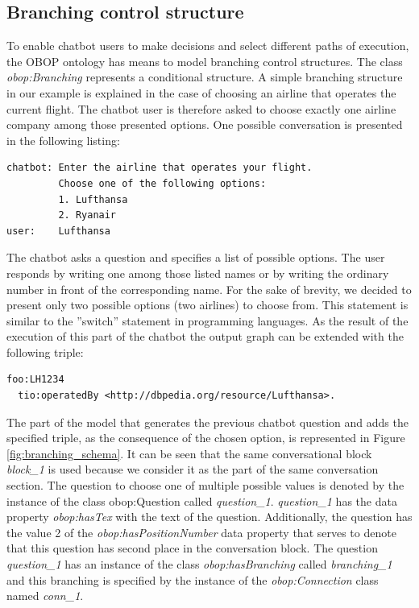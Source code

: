 \documentclass[runningheads]{llncs}
\begin{document}
\FloatBarrier
\subsection{Branching control structure}
To enable chatbot users to make decisions and select different paths of execution, the OBOP ontology has means to model branching control structures. The class \textit{obop:Branching} represents a conditional structure. A simple branching structure in our example is explained in the case of choosing an airline that operates the current flight. The chatbot user is therefore asked to choose exactly one airline company among those presented options.  
One possible conversation is presented in the following listing:
\begin{lstlisting}[basicstyle=\small,  xleftmargin=0.7cm ]
chatbot: Enter the airline that operates your flight.
         Choose one of the following options:
         1. Lufthansa
         2. Ryanair
user:    Lufthansa 
\end{lstlisting}
The chatbot asks a question and specifies a list of possible options. The user responds by writing one among those listed names or by writing the ordinary number in front of the corresponding name. For the sake of brevity, we decided to present only two possible options (two airlines) to choose from. This statement is similar to the ''switch'' statement in programming languages. As the result of the execution of this part of the chatbot the output graph can be extended with the following triple:
\begin{lstlisting}[basicstyle=\small,  xleftmargin=0.7cm ]
foo:LH1234
  tio:operatedBy <http://dbpedia.org/resource/Lufthansa>.
\end{lstlisting}
The part of the model that generates the previous chatbot question and adds the specified triple, as the consequence of the chosen option, is represented in Figure \ref{fig:branching_schema}. It can be seen that the same conversational block \textit{block\_1} is used because we consider it as the part of the same conversation section. The question to choose one of multiple possible values is denoted by the instance of the class obop:Question called \textit{question\_1}. \textit{question\_1} has the data property \textit{obop:hasTex} with the text of the question. Additionally, the question has the value 2 of the \textit{obop:hasPositionNumber} data property that serves to denote that this question has second place in the conversation block.         
The question \textit{question\_1} has an instance of the class \textit{obop:hasBranching} called \textit{branching\_1} and this branching is specified by the instance of the \textit{obop:Connection} class named \textit{conn\_1}.
\end{document}
